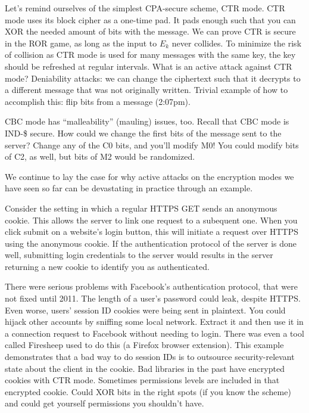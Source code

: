 Let's remind ourselves of the simplest CPA-secure scheme, CTR mode.
CTR mode uses its block cipher as a one-time pad. It pads enough such that you can XOR the needed amount of bits with the message. We can prove CTR is secure in the ROR game, as long as the input to $E_k$ never collides. To minimize the risk of collision as CTR mode is used for many messages with the same key, the key should be refreshed at regular intervals.
What is an active attack against CTR mode? Deniability attacks: we can change the ciphertext such that it decrypts to a different message that was not originally written. Trivial example of how to accomplish this: flip bits from a message (2:07pm).


CBC mode has ``malleability'' (mauling) issues, too. Recall that CBC mode is IND-\$ secure. How could we change the first bits of the message sent to the server?  Change any of the C0 bits, and you'll modify M0!
You could modify bits of C2, as well, but bits of M2 would be randomized.

We continue to lay the case for why active attacks on the encryption modes we have seen so far can be devastating in practice through an example.

\begin{example} Consider the setting in which a regular HTTPS GET sends an anonymous cookie. This allows the server to link one request to a subequent one. When you click submit on a website's login button, this will initiate a request over HTTPS using the anonymous cookie. If the authentication protocol of the server is done well, submitting login credentials to the server would results in the server returning a new cookie to identify you as authenticated.

There were serious problems with Facebook's authentication protocol, that were not fixed until 2011. The length of a user's password could leak, despite HTTPS.
Even worse, users' session ID cookies were being sent in plaintext. You could hijack other accounts by sniffing some local network. Extract it and then use it in a connection request to Facebook without needing to login. There was even a tool called Firesheep used to do this (a Firefox browser extension).
This example demonstrates that a bad way to do session IDs is to outsource security-relevant state about the client in the cookie.
Bad libraries in the past have encrypted cookies with CTR mode. Sometimes permissions levels are included in that encrypted cookie. Could XOR bits in the right spots (if you know the scheme) and could get yourself permissions you shouldn't have.
\end{example}


